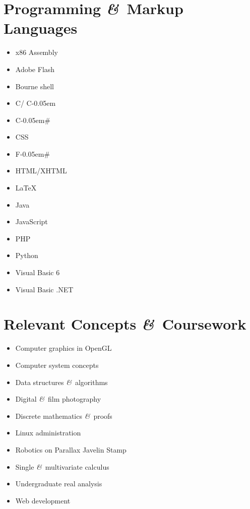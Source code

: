 \documentclass[11pt]{simplecv}
\newcommand*\amp{{\fertigopro\itshape\&}}
\newcommand*\CPP{%
  C\nolinebreak\kern-0.05em%
  \raisebox{0.12ex}{+\nolinebreak\kern-0.08em+}}
\newcommand*\CS{C\nolinebreak\kern-0.05em\#}
\newcommand*\FS{F\nolinebreak\kern-0.05em\#}
\begin{document}
  \newpage

  \section{Programming \amp\ Markup Languages}
  \begin{multicols}{3}
    \begin{itemize}
      \item x86 Assembly
      \item Adobe Flash
      \item Bourne shell
      \item C/\CPP
      \item \CS
      \item CSS
      \item \FS
      \item HTML/XHTML
      \item \LaTeX
      \item Java
      \item JavaScript
      \item PHP
      \item Python
      \item Visual Basic 6
      \item Visual Basic .NET
    \end{itemize}
  \end{multicols}

  \section{Relevant Concepts \amp\ Coursework}
  \begin{multicols}{2}
    \begin{itemize}
      \item Computer graphics in OpenGL
      \item Computer system concepts
      \item Data structures \amp\ algorithms
      \item Digital \amp\ film photography
      \item Discrete mathematics \amp\ proofs
      \item Linux administration
      \item Robotics on Parallax Javelin Stamp
      \item Single \amp\ multivariate calculus
      \item Undergraduate real analysis
      \item Web development
    \end{itemize}
  \end{multicols}
\end{document}
